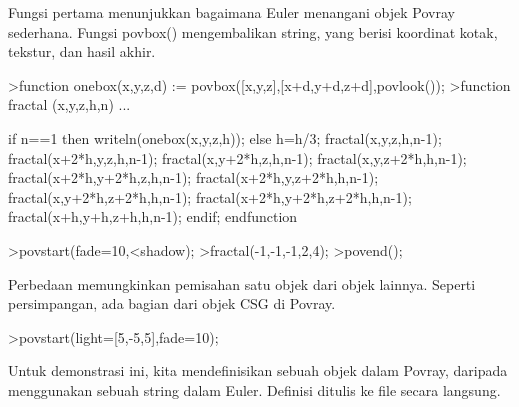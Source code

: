 \documentclass{article}
\begin{document}
\begin{eulernotebook}
\begin{eulercomment}
\begin{eulercomment}
\begin{eulercomment}
\begin{eulercomment}
\begin{eulercomment}
Fungsi pertama menunjukkan bagaimana Euler menangani objek Povray
sederhana. Fungsi povbox() mengembalikan string, yang berisi koordinat
kotak, tekstur, dan hasil akhir.
\end{eulercomment}
\begin{eulerprompt}
>function onebox(x,y,z,d) := povbox([x,y,z],[x+d,y+d,z+d],povlook());
>function fractal (x,y,z,h,n) ...
\end{eulerprompt}
\begin{eulerudf}
   if n==1 then writeln(onebox(x,y,z,h));
   else
     h=h/3;
     fractal(x,y,z,h,n-1);
     fractal(x+2*h,y,z,h,n-1);
     fractal(x,y+2*h,z,h,n-1);
     fractal(x,y,z+2*h,h,n-1);
     fractal(x+2*h,y+2*h,z,h,n-1);
     fractal(x+2*h,y,z+2*h,h,n-1);
     fractal(x,y+2*h,z+2*h,h,n-1);
     fractal(x+2*h,y+2*h,z+2*h,h,n-1);
     fractal(x+h,y+h,z+h,h,n-1);
   endif;
  endfunction
\end{eulerudf}
\begin{eulerprompt}
>povstart(fade=10,<shadow);
>fractal(-1,-1,-1,2,4);
>povend();
\end{eulerprompt}
\begin{eulercomment}
Perbedaan memungkinkan pemisahan satu objek dari objek lainnya.
Seperti persimpangan, ada bagian dari objek CSG di Povray.
\end{eulercomment}
\begin{eulerprompt}
>povstart(light=[5,-5,5],fade=10);
\end{eulerprompt}
\begin{eulercomment}
Untuk demonstrasi ini, kita mendefinisikan sebuah objek dalam Povray,
daripada menggunakan sebuah string dalam Euler. Definisi ditulis ke
file secara langsung.


\end{eulercomment}
\end{eulercomment}
\end{eulercomment}
\end{eulercomment}
\end{eulercomment}
\end{eulernotebook}
\end{document}
